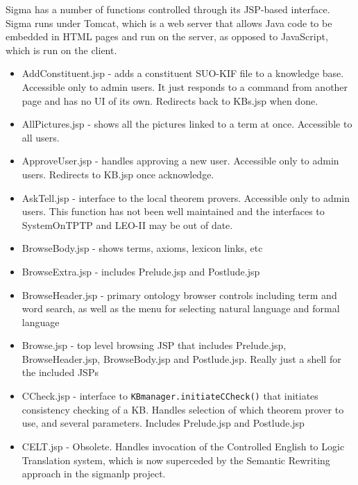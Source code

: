 \documentclass{book}
\begin{document}
Sigma has a number of functions controlled through its JSP-based interface.  Sigma
runs under Tomcat, which is a web server that allows Java code to be embedded in
HTML pages and run on the server, as opposed to JavaScript, which is run on the
client.

\begin{itemize}

\item AddConstituent.jsp - adds a constituent SUO-KIF file to a knowledge base.  Accessible only to
admin users.  It just responds to a command from another page and has no UI of its own.
Redirects back to KBs.jsp when done.

\item AllPictures.jsp - shows all the pictures linked to a term at once.  Accessible to all users.

\item ApproveUser.jsp - handles approving a new user.  Accessible only to admin users. Redirects
to KB.jsp once acknowledge.

\item AskTell.jsp - interface to the local theorem provers. Accessible only to admin users. This function
has not been well maintained and the interfaces to SystemOnTPTP and LEO-II may be out of date.

\item BrowseBody.jsp - shows terms, axioms, lexicon links, etc

\item BrowseExtra.jsp - includes Prelude.jsp and Postlude.jsp

\item BrowseHeader.jsp - primary ontology browser controls including term and word search, as well as
the menu for selecting natural language and formal language

\item Browse.jsp - top level browsing JSP that includes Prelude.jsp, BrowseHeader.jsp, BrowseBody.jsp
and Postlude.jsp.  Really just a shell for the included JSPs

\item CCheck.jsp - interface to \texttt{KBmanager.initiateCCheck()} that initiates consistency checking of a KB.
Handles selection of which theorem prover to use, and several parameters.  Includes Prelude.jsp
and Postlude.jsp

\item CELT.jsp - Obsolete.  Handles invocation of the Controlled English to Logic Translation system,
which is now superceded by the Semantic Rewriting approach in the sigmanlp project.


\end{itemize}
\end{document}
